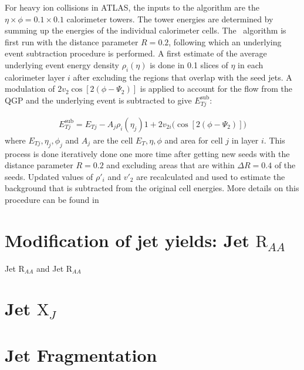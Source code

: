 For heavy ion collisions in ATLAS, the inputs to the algorithm are the $\eta \times \phi = 0.1 \times 0.1$ calorimeter towers. The tower energies are determined by summing up the energies of the individual calorimeter cells. The \antikt\ algorithm is first run with the distance parameter $R=0.2$, following which an underlying event subtraction procedure is performed. A first estimate of the average underlying event energy density $\rho_i (\eta)$ is done in 0.1 slices of $\eta$ in each calorimeter layer $i$ after excluding the regions that overlap with the seed jets. A modulation of $2v_{2} \cos[2(\phi-\Psi_2)] $ is applied to account for the flow from the QGP and the underlying event is subtracted to give $E_{Tj}^{\mathrm{sub}}$:

\begin{align}
E_{Tj}^{\mathrm{sub}} = E_{Tj} - A_j \rho_i (\eta_j) 1+2v_{2i} \big(\cos[2(\phi-\Psi_2)] \big)
\end{align}
where $ E_{Tj} , \eta_j, \phi_j$ and $A_j$ are the cell $E_T, \eta, \phi$ and area for cell $j$ in layer $i$. This process is done iteratively done one more time after getting new seeds with the distance parameter $R = 0.2$ and excluding areas that are within $\Delta R = 0.4$ of the seeds. Updated values of $\rho{'}_i$ and $v{'}_2$ are recalculated and used to estimate the background that is subtracted from the original cell energies. More details on this procedure can be found in \cite{2013220}

























\section{Modification of jet yields: {\textsc Jet $\mathrm{R}_{AA}$} }
{\textsc Jet $\mathrm{R}_{AA}$} and {Jet $\mathrm{R}_{AA}$}

%





\section{Jet $\mathrm{X}_{J}$}
\section{Jet Fragmentation}



